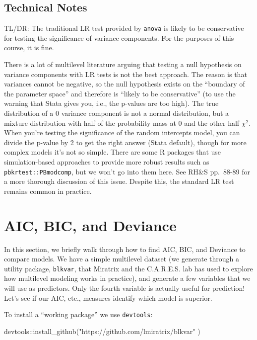 \documentclass[
  letterpaper,
  DIV=11,
  numbers=noendperiod]{scrreprt}
\newenvironment{Shaded}{\begin{snugshade}}{\end{snugshade}}
\newcommand{\FunctionTok}[1]{\textcolor[rgb]{0.02,0.16,0.49}{#1}}
\newcommand{\NormalTok}[1]{\textcolor[rgb]{0.00,0.44,0.13}{#1}}
\newcommand{\SpecialCharTok}[1]{\textcolor[rgb]{0.25,0.44,0.63}{#1}}
\newcommand{\StringTok}[1]{\textcolor[rgb]{0.25,0.44,0.63}{#1}}
\begin{document}
\hypertarget{technical-notes}{%
\section{Technical Notes}\label{technical-notes}}

TL/DR: The traditional LR test provided by \texttt{anova} is likely to
be conservative for testing the significance of variance components. For
the purposes of this course, it is fine.

There is a lot of multilevel literature arguing that testing a null
hypothesis on variance components with LR tests is not the best
approach. The reason is that variances cannot be negative, so the null
hypothesis exists on the ``boundary of the parameter space'' and
therefore is ``likely to be conservative'' (to use the warning that
Stata gives you, i.e., the p-values are too high). The true distribution
of a 0 variance component is not a normal distribution, but a mixture
distribution with half of the probability mass at 0 and the other half
\(\chi^2\). When you're testing the significance of the random
intercepts model, you can divide the p-value by 2 to get the right
answer (Stata default), though for more complex models it's not so
simple. There are some R packages that use simulation-based approaches
to provide more robust results such as \texttt{pbkrtest::PBmodcomp}, but
we won't go into them here. See RH\&S pp.~88-89 for a more thorough
discussion of this issue. Despite this, the standard LR test remains
common in practice.

\hypertarget{aic-bic-and-deviance}{%
\chapter{AIC, BIC, and Deviance}\label{aic-bic-and-deviance}}

In this section, we briefly walk through how to find AIC, BIC, and
Deviance to compare models. We have a simple multilevel dataset (we
generate through a utility package, \texttt{blkvar}, that Miratrix and
the C.A.R.E.S. lab has used to explore how multilevel modeling works in
practice), and generate a few variables that we will use as predictors.
Only the fourth variable is actually useful for prediction! Let's see if
our AIC, etc., measures identify which model is superior.

To install a ``working package'' we use \texttt{devtools}:

\begin{Shaded}
\begin{Highlighting}[]
\NormalTok{devtools}\SpecialCharTok{::}\FunctionTok{install\_github}\NormalTok{(}\StringTok{"https://github.com/lmiratrix/blkvar"}\NormalTok{ )}
\end{Highlighting}
\end{Shaded}
\end{document}
